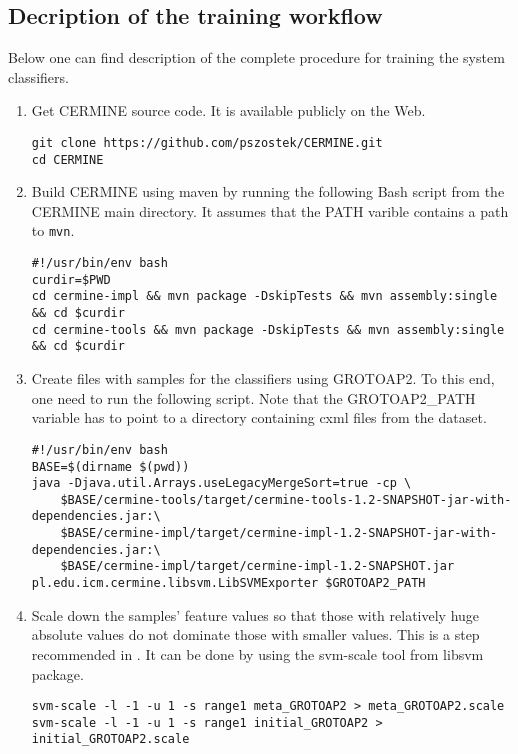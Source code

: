 \begin{appendix}
\noappendicestocpagenum
\addappheadtotoc
\chapter{Decription of the training workflow}
\label{appendix:training_workflow}
Below one can find description of the complete procedure for training the system classifiers.
\begin{enumerate}
\item Get CERMINE source code. It is available publicly on the Web.
\lstset{language=bash}
\begin{lstlisting}
git clone https://github.com/pszostek/CERMINE.git
cd CERMINE
\end{lstlisting}
\item Build CERMINE using maven by running the following Bash script from the CERMINE main directory. It assumes that the PATH varible contains a path to \verb+mvn+.
\begin{lstlisting}
#!/usr/bin/env bash
curdir=$PWD
cd cermine-impl && mvn package -DskipTests && mvn assembly:single && cd $curdir
cd cermine-tools && mvn package -DskipTests && mvn assembly:single && cd $curdir
\end{lstlisting}
\item Create files with samples for the classifiers using GROTOAP2. To this end, one need to run the following script. Note that the GROTOAP2\_PATH variable has to point to a directory containing cxml files from the dataset.
\begin{lstlisting}
#!/usr/bin/env bash
BASE=$(dirname $(pwd))
java -Djava.util.Arrays.useLegacyMergeSort=true -cp \
    $BASE/cermine-tools/target/cermine-tools-1.2-SNAPSHOT-jar-with-dependencies.jar:\
    $BASE/cermine-impl/target/cermine-impl-1.2-SNAPSHOT-jar-with-dependencies.jar:\
    $BASE/cermine-impl/target/cermine-impl-1.2-SNAPSHOT.jar pl.edu.icm.cermine.libsvm.LibSVMExporter $GROTOAP2_PATH
\end{lstlisting}
\item Scale down the samples' feature values so that those with relatively huge absolute values do not dominate those with smaller values. This is a step recommended in \cite{Chih-WeiHsu2010}. It can be done by using the svm-scale tool from libsvm package.
\begin{lstlisting}
svm-scale -l -1 -u 1 -s range1 meta_GROTOAP2 > meta_GROTOAP2.scale
svm-scale -l -1 -u 1 -s range1 initial_GROTOAP2 > initial_GROTOAP2.scale
\end{lstlisting}

\end{enumerate}
\end{appendix}
